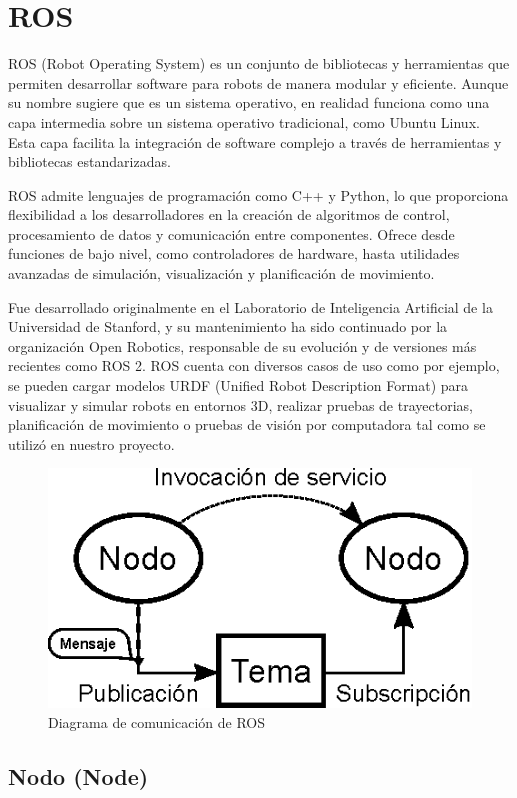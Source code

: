 \section{ROS} \label{sec:ros}

ROS (Robot Operating System) es un conjunto de bibliotecas y herramientas que permiten desarrollar software para robots de manera modular y eficiente. Aunque su nombre sugiere que es un sistema operativo, en realidad funciona como una capa intermedia sobre un sistema operativo tradicional, como Ubuntu Linux. Esta capa facilita la integración de software complejo a través de herramientas y bibliotecas estandarizadas.

ROS admite lenguajes de programación como C++ y Python, lo que proporciona flexibilidad a los desarrolladores en la creación de algoritmos de control, procesamiento de datos y comunicación entre componentes. Ofrece desde funciones de bajo nivel, como controladores de hardware, hasta utilidades avanzadas de simulación, visualización y planificación de movimiento.

Fue desarrollado originalmente en el Laboratorio de Inteligencia Artificial de la Universidad de Stanford, y su mantenimiento ha sido continuado por la organización Open Robotics, responsable de su evolución y de versiones más recientes como ROS 2. ROS cuenta con diversos casos de uso como por ejemplo, se pueden cargar modelos URDF (Unified Robot Description Format) para visualizar y simular robots en entornos 3D, realizar pruebas de trayectorias, planificación de movimiento o pruebas de visión por computadora tal como se utilizó en nuestro proyecto. 

\begin{figure}[h]
	\centering
	\includegraphics[width=0.5\linewidth]{img/ROS_concepts}
	\caption{Diagrama de comunicación de ROS}
	\label{fig:rosconcepts}
\end{figure}



\subsection{Nodo (Node)}

